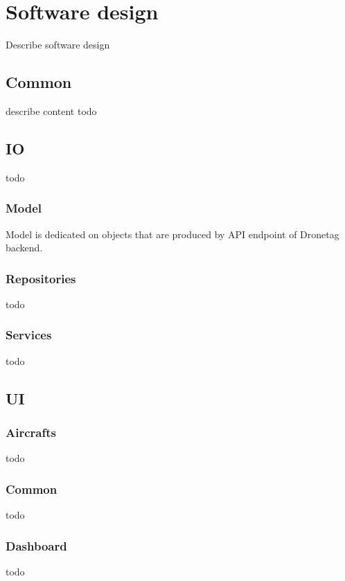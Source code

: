 \chapter{Software design}\label{ch:software-design}
Describe software design

\section{Common}\label{sec:common}
describe content
todo

\section{IO}\label{sec:io}
todo

\subsection{Model}\label{subsec:model}
Model is dedicated on objects that are produced by API endpoint of Dronetag backend.

\subsection{Repositories}\label{subsec:respositories}
todo

\subsection{Services}\label{subsec:services}
todo

\section{UI}\label{sec:ui}

\subsection{Aircrafts}\label{subsec:aircrafts}
todo

\subsection{Common}\label{subsec:common}
todo

\subsection{Dashboard}\label{subsec:dashboard}
todo


